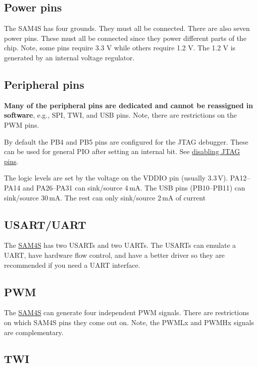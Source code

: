 \subsection{Power pins}\label{power-pins}

The SAM4S has four grounds. They must all be connected. There are also
seven power pins. These must all be connected since they power different
parts of the chip. Note, some pins require 3.3 V while others require
1.2 V. The 1.2 V is generated by an internal voltage regulator.

\subsection{Peripheral pins}\label{peripheral-pins}

\textbf{Many of the peripheral pins are dedicated and cannot be
reassigned in software}, e.g., SPI, TWI, and USB pins. Note, there are
restrictions on the PWM pins.

By default the PB4 and PB5 pins are configured for the JTAG debugger.
These can be used for general PIO after setting an internal bit.  See
\protect\hyperref[disabling-jtag-pins]{disabling JTAG pins}.

The logic levels are set by the voltage on the VDDIO pin (usually
3.3\,V).  PA12--PA14 and PA26--PA31 can sink/source 4\,mA.  The USB
pins (PB10--PB11) can sink/source 30\,mA.  The rest can only
sink/source 2\,mA of current


\subsection{USART/UART}\label{usartuart}

The \url{SAM4S} has two USARTs and two UARTs. The USARTs can emulate a
UART, have hardware flow control, and have a better driver so they are
recommended if you need a UART interface.


\subsection{PWM}\label{pwm}

The \url{SAM4S} can generate four independent PWM signals. There are
restrictions on which SAM4S pins they come out on. Note, the PWMLx and
PWMHx signals are complementary.

\subsection{TWI}\label{twi}


